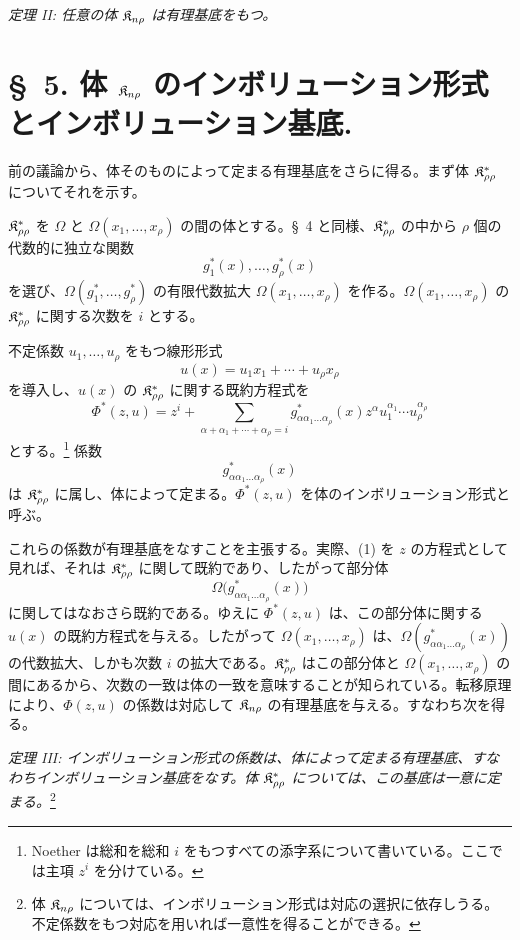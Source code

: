 \documentclass[11pt]{jlreq}
\begin{document}
\emph{定理 II: 任意の体 $\mathfrak{K}_{n\rho}$ は有理基底をもつ。}

\section*{\S\ 5. 体 $\mathfrak{K}_{n\rho}$ のインボリューション形式とインボリューション基底.}

前の議論から、体そのものによって定まる有理基底をさらに得る。まず体 $\mathfrak{K}^*_{\rho\rho}$ についてそれを示す。

$\mathfrak{K}^*_{\rho\rho}$ を $\Omega$ と $\Omega(x_1,\ldots,x_\rho)$ の間の体とする。\S\ 4 と同様、$\mathfrak{K}^*_{\rho\rho}$ の中から $\rho$ 個の代数的に独立な関数
\[
  g_1^*(x),\ldots,g_\rho^*(x)
\]
を選び、$\Omega(g_1^*,\ldots,g_\rho^*)$ の有限代数拡大 $\Omega(x_1,\ldots,x_\rho)$ を作る。$\Omega(x_1,\ldots,x_\rho)$ の $\mathfrak{K}^*_{\rho\rho}$ に関する次数を $i$ とする。

不定係数 $u_1,\ldots,u_\rho$ をもつ線形形式
\[
  u(x)=u_1x_1+\cdots+u_\rho x_\rho
\]
を導入し、$u(x)$ の $\mathfrak{K}^*_{\rho\rho}$ に関する既約方程式を
\begin{equation}
 \Phi^*(z,u)=z^i+\sum_{\alpha+\alpha_1+\cdots+\alpha_\rho=i}
 g^*_{\alpha\alpha_1\ldots\alpha_\rho}(x)
 z^\alpha u_1^{\alpha_1}\cdots u_\rho^{\alpha_\rho}
\tag{1}
\end{equation}
とする。\footnote{Noether は総和を総和 $i$ をもつすべての添字系について書いている。ここでは主項 $z^i$ を分けている。} 係数
\[
  g^*_{\alpha\alpha_1\ldots\alpha_\rho}(x)
\]
は $\mathfrak{K}^*_{\rho\rho}$ に属し、体によって定まる。$\Phi^*(z,u)$ を体のインボリューション形式と呼ぶ。

これらの係数が有理基底をなすことを主張する。実際、(1) を $z$ の方程式として見れば、それは $\mathfrak{K}^*_{\rho\rho}$ に関して既約であり、したがって部分体
\[
  \Omega\bigl(g^*_{\alpha\alpha_1\ldots\alpha_\rho}(x)\bigr)
\]
に関してはなおさら既約である。ゆえに $\Phi^*(z,u)$ は、この部分体に関する $u(x)$ の既約方程式を与える。したがって $\Omega(x_1,\ldots,x_\rho)$ は、$\Omega(g^*_{\alpha\alpha_1\ldots\alpha_\rho}(x))$ の代数拡大、しかも次数 $i$ の拡大である。$\mathfrak{K}^*_{\rho\rho}$ はこの部分体と $\Omega(x_1,\ldots,x_\rho)$ の間にあるから、次数の一致は体の一致を意味することが知られている。転移原理により、$\Phi(z,u)$ の係数は対応して $\mathfrak{K}_{n\rho}$ の有理基底を与える。すなわち次を得る。

\emph{定理 III: インボリューション形式の係数は、体によって定まる有理基底、すなわちインボリューション基底をなす。体 $\mathfrak{K}^*_{\rho\rho}$ については、この基底は一意に定まる。}\footnote{体 $\mathfrak{K}_{n\rho}$ については、インボリューション形式は対応の選択に依存しうる。不定係数をもつ対応を用いれば一意性を得ることができる。}
\end{document}
